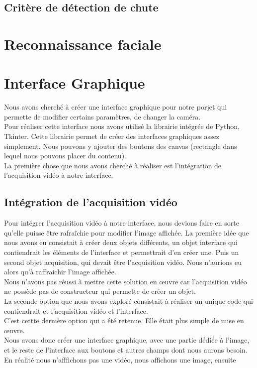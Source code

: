 \documentclass[a4paper]{report}
\begin{document}
        \subsection{Critère de détection de chute}
    \section{Reconnaissance faciale}
        \section{Interface Graphique}
            Nous avons cherché à créer une interface graphique pour notre porjet qui permette de modifier certains paramètres, de changer la caméra.\\
            Pour réaliser cette interface nous avons utilisé la librairie intégrée de Python, Tkinter. Cette librairie permet de créer des interfaces graphiques assez simplement. Nous pouvons y ajouter des boutons des canvas (rectangle dans lequel nous pouvons placer du contenu).\\
            La première chose que nous avons cherché à réaliser est l'intégration de l'acquisition vidéo à notre interface. 
            \subsection{Intégration de l'acquisition vidéo}
            Pour intégrer l'acquisition vidéo à notre interface, nous devions faire en sorte qu'elle puisse être rafraîchie pour modifier l'image affichée. La première idée que nous avons eu consistait à créer deux objets différents, un objet interface qui contiendrait les éléments de l'interface et permettrait d'en créer une. Puis un second objet acquisition, qui devait être l'acquisition vidéo. Nous n'aurions eu alors qu'à raffraichir l'image affichée.\\
            Nous n'avons pas réussi à mettre cette solution en œuvre car l'acquisition vidéo ne possède pas de constructeur qui permette de créer un objet.\\
            La seconde option que nous avons exploré consistait à réaliser un unique code qui contiendrait et l'acquisition vidéo et l'interface.\\
            C'est cettte dernière option qui a été retenue. Elle était plus simple de mise en œuvre.\\
            Nous avons donc créer une interface graphique, avec une partie dédiée à l'image, et le reste de l'interface aux boutons et autres champs dont nous aurons besoin. En réalité nous n'afffichons pas une vidéo, nous affichons une image, ensuite 
\end{document}
